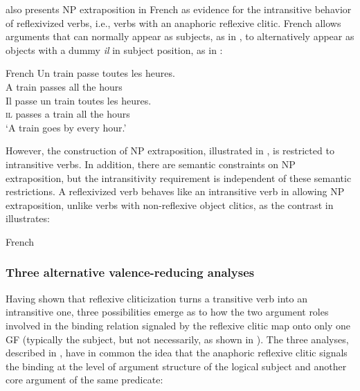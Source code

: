 \documentclass[output=paper,hidelinks]{langscibook}
\begin{document}
\citet{Grimshaw1982} also presents NP extraposition in French as evidence for the intransitive behavior of reflexivized verbs, i.e., verbs with an anaphoric reflexive clitic. French allows arguments that can normally appear as subjects, as in , to alternatively appear as objects with a dummy \textit{il} in subject position, as in :

\ea\label{ex:Romance:24} French  \citep[112]{Grimshaw1982}
\ea\label{ex:Romance:24a}
\gll
Un train passe toutes les heures.\\
A train passes all the hours\\
\ex\label{ex:Romance:24b}
\gll
Il passe un train toutes les heures.\\
\textsc{il} passes a train all the hours\\
\glt   `A train goes by every hour.'
\z\z

However, the construction of NP extraposition, illustrated in , is restricted to intransitive verbs. In addition, there are semantic constraints on NP extraposition, but the intransitivity requirement is independent of these semantic restrictions. A reflexivized verb behaves like an intransitive verb in allowing NP extraposition, unlike verbs with non-reflexive object clitics, as the contrast in  illustrates:

\ea\label{ex:Romance:25} French  \citep[113]{Grimshaw1982}
\z\z

\subsubsection{Three alternative valence-reducing analyses}
\label{sec:Romance:2.3.2}

Having shown that reflexive cliticization turns a transitive verb into an intransitive one, three possibilities emerge as to how the two argument roles involved in the binding relation signaled by the reflexive clitic map onto only one GF (typically the subject, but not necessarily, as shown in ). The three analyses, described in , have in common the idea that the anaphoric reflexive clitic signals the binding at the level of argument structure of the logical subject and another core argument of the same predicate:
\end{document}
